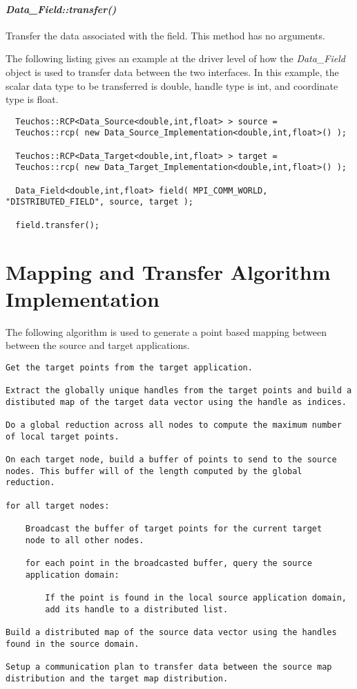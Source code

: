\documentclass[letterpaper]{article}
\begin{document}
\paragraph{\sl Data\_Field::transfer()}
Transfer the data associated with the field. This method has no
arguments. 

The following listing gives an example at the driver level of how the
{\sl Data\_Field} object is used to transfer data between the two
interfaces. In this example, the scalar data type to be transferred is
double, handle type is int, and coordinate type is float.

\begin{lstlisting}
  Teuchos::RCP<Data_Source<double,int,float> > source = 
  Teuchos::rcp( new Data_Source_Implementation<double,int,float>() );

  Teuchos::RCP<Data_Target<double,int,float> > target = 
  Teuchos::rcp( new Data_Target_Implementation<double,int,float>() );

  Data_Field<double,int,float> field( MPI_COMM_WORLD, "DISTRIBUTED_FIELD", source, target ); 

  field.transfer();
\end{lstlisting}

\section{Mapping and Transfer Algorithm Implementation}
The following algorithm is used to generate a point based mapping
between between the source and target applications.

\begin{verbatim}
Get the target points from the target application.

Extract the globally unique handles from the target points and build a
distibuted map of the target data vector using the handle as indices.

Do a global reduction across all nodes to compute the maximum number
of local target points.

On each target node, build a buffer of points to send to the source
nodes. This buffer will of the length computed by the global
reduction.

for all target nodes:

    Broadcast the buffer of target points for the current target
    node to all other nodes.

    for each point in the broadcasted buffer, query the source
    application domain:

        If the point is found in the local source application domain,
        add its handle to a distributed list.

Build a distributed map of the source data vector using the handles
found in the source domain.

Setup a communication plan to transfer data between the source map
distribution and the target map distribution.
\end{verbatim}
\end{document}

